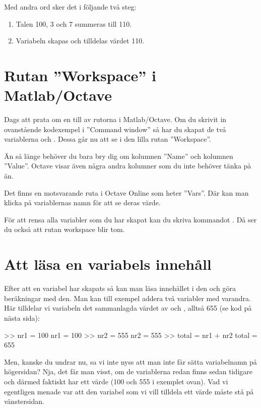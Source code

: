Med andra ord sker det i följande två steg:
\begin{enumerate}
\item Talen 100, 3 och 7 summeras till 110.
\item Variabeln  skapas och tilldelas värdet 110.
\end{enumerate}


\section {Rutan ''Workspace'' i Matlab/Octave}
Dags att prata om en till av rutorna i Matlab/Octave. Om du skrivit in ovanstående kodexempel i ''Command window'' så har du skapat de två variablerna  och . Dessa går nu att se i den lilla rutan ''Workspace''.


Än så länge behöver du bara bry dig om kolumnen ''Name'' och kolumnen ''Value''. Octave visar även några andra kolumner som du inte behöver tänka på än.

Det finns en motsvarande ruta i Octave Online som heter ''Vars''. Där kan man klicka på variablernas namn för att se deras värde.

För att rensa alla variabler som du har skapat kan du skriva kommandot . Då ser du också att rutan workspace blir tom.


\section{Att läsa en variabels innehåll}
Efter att en variabel har skapats så kan man läsa innehållet i den och göra beräkningar med den. Man kan till exempel addera två variabler med varandra. Här tilldelar vi variabeln  det sammanlagda värdet av  och , alltså 655 (se kod på nästa sida):
\newpage
\begin{matlab}[caption={Addera två variabler},label={}]
>> nr1 = 100
nr1 =  100
>> nr2 = 555
nr2 =  555
>> total = nr1 + nr2
total =  655
\end{matlab}

Men, kanske du undrar nu, sa vi inte nyss att man inte får sätta variabelnamn på högersidan? Nja, det får man visst, om de variablerna redan finns sedan tidigare och därmed faktiskt har ett värde (100 och 555 i exemplet ovan). Vad vi egentligen menade var att den variabel som vi vill tilldela ett värde måste stå på vänstersidan.

